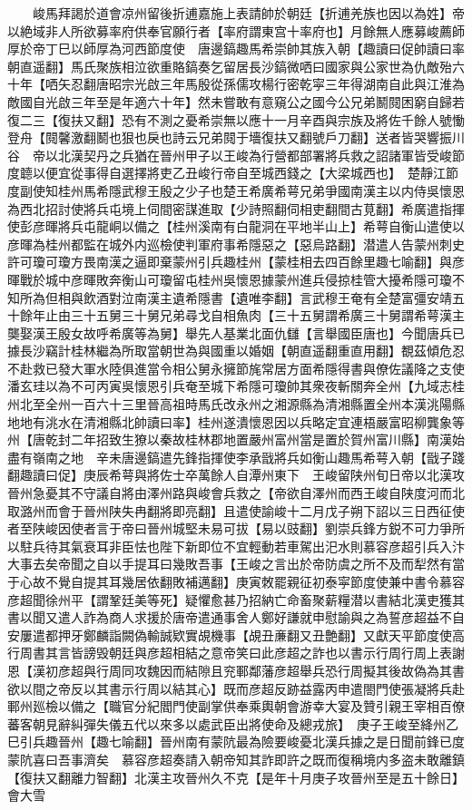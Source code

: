 　　峻馬拜謁於道會凉州留後折逋嘉施上表請帥於朝廷【折逋羌族也因以為姓】帝以絶域非人所欲募率府供奉官願行者【率府謂東宫十率府也】月餘無人應募峻薦師厚於帝丁巳以師厚為河西節度使　唐邊鎬趣馬希崇帥其族入朝【趣讀曰促帥讀曰率朝直遥翻】馬氏聚族相泣欲重賂鎬奏乞留居長沙鎬微哂曰國家與公家世為仇敵殆六十年【哂矢忍翻唐昭宗光啟三年馬殷從孫儒攻楊行密乾寜三年得湖南自此與江淮為敵國自光啟三年至是年適六十年】然未嘗敢有意窺公之國今公兄弟鬭䦧困窮自歸若復二三【復扶又翻】恐有不測之憂希崇無以應十一月辛酉與宗族及將佐千餘人號慟登舟【䦧馨激翻鬭也狠也戾也詩云兄弟䦧于墻復扶又翻號戶刀翻】送者皆哭響振川谷　帝以北漢契丹之兵猶在晉州甲子以王峻為行營都部署將兵救之詔諸軍皆受峻節度聼以便宜從事得自選擇將吏乙丑峻行帝自至城西錢之【大梁城西也】　楚靜江節度副使知桂州馬希隱武穆王殷之少子也楚王希廣希萼兄弟爭國南漢主以内侍吳懷恩為西北招討使將兵屯境上伺間密謀進取【少詩照翻伺相吏翻間古莧翻】希廣遣指揮使彭彦暉將兵屯龍峒以備之【桂州溪南有白龍洞在平地半山上】希萼自衡山遣使以彦暉為桂州都監在城外内巡檢使判軍府事希隱惡之【惡烏路翻】潜遣人告蒙州刺史許可瓊可瓊方畏南漢之逼即棄蒙州引兵趣桂州【蒙桂相去四百餘里趣七喻翻】與彦暉戰於城中彦暉敗奔衡山可瓊留屯桂州吳懷恩據蒙州進兵侵掠桂管大擾希隱可瓊不知所為但相與飲酒對泣南漢主遺希隱書【遺唯李翻】言武穆王奄有全楚富彊安靖五十餘年止由三十五舅三十舅兄弟尋戈自相魚肉【三十五舅謂希廣三十舅謂希萼漢主龑娶漢王殷女故呼希廣等為舅】舉先人基業北面仇讎【言舉國臣唐也】今聞唐兵已據長沙竊計桂林繼為所取當朝世為與國重以婚姻【朝直遥翻重直用翻】覩茲傾危忍不赴救已發大軍水陸俱進當令相公舅永擁節旄常居方面希隱得書與僚佐議降之支使潘玄珪以為不可丙寅吳懷恩引兵奄至城下希隱可瓊帥其衆夜斬關奔全州【九域志桂州北至全州一百六十三里晉高祖時馬氏改永州之湘源縣為清湘縣置全州本漢洮陽縣地地有洮水在清湘縣北帥讀曰率】桂州遂潰懷恩因以兵略定宜連梧嚴富昭柳龔象等州【唐乾封二年招致生獠以秦故桂林郡地置嚴州富州當是置於賀州富川縣】南漢始盡有嶺南之地　辛未唐邊鎬遣先鋒指揮使李承戩將兵如衡山趣馬希萼入朝【戩子踐翻趣讀曰促】庚辰希萼與將佐士卒萬餘人自潭州東下　王峻留陕州旬日帝以北漢攻晉州急憂其不守議自將由澤州路與峻會兵救之【帝欲自澤州而西王峻自陕度河而北取潞州而會于晉州陕失冉翻將即亮翻】且遣使諭峻十二月戊子朔下詔以三日西征使者至陕峻因使者言于帝曰晉州城堅未易可拔【易以豉翻】劉崇兵鋒方鋭不可力爭所以駐兵待其氣衰耳非臣怯也陛下新即位不宜輕動若車駕出汜水則慕容彦超引兵入汴大事去矣帝聞之自以手提耳曰幾敗吾事【王峻之言出於帝防虞之所不及而犁然有當于心故不覺自提其耳幾居依翻敗補邁翻】庚寅敇罷親征初泰寜節度使兼中書令慕容彦超聞徐州平【謂鞏廷美等死】疑懼愈甚乃招納亡命畜聚薪糧潜以書結北漢吏獲其書以聞又遣人詐為商人求援於唐帝遣通事舍人鄭好謙就申慰諭與之為誓彦超益不自安屢遣都押牙鄭麟詣闕偽輸誠欵實覘機事【覘丑亷翻又丑艶翻】又獻天平節度使高行周書其言皆謗毁朝廷與彦超相結之意帝笑曰此彦超之詐也以書示行周行周上表謝恩【漢初彦超與行周同攻魏因而結隙且兖鄆鄰藩彦超舉兵恐行周擬其後故偽為其書欲以間之帝反以其書示行周以結其心】既而彦超反跡益露丙申遣閤門使張凝將兵赴鄆州廵檢以備之【職官分紀閻門使副掌供奉乘輿朝會游幸大宴及贊引親王宰相百僚蕃客朝見辭糾彈失儀五代以來多以處武臣出將使命及總戎旅】　庚子王峻至絳州乙巳引兵趣晉州【趣七喻翻】晉州南有蒙阬最為險要峻憂北漢兵據之是日聞前鋒已度蒙阬喜曰吾事濟矣　慕容彦超奏請入朝帝知其詐即許之既而復稱境内多盗未敢離鎮【復扶又翻離力智翻】北漢主攻晉州久不克【是年十月庚子攻晉州至是五十餘日】會大雪

